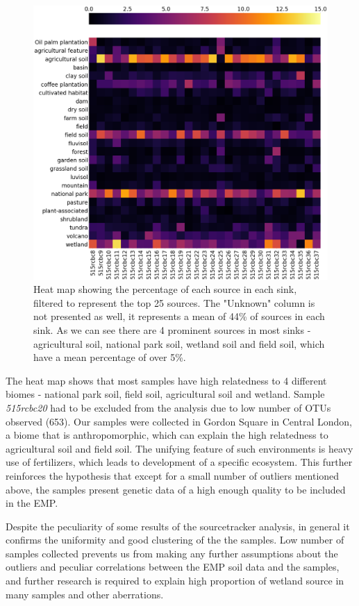 \documentclass[12pt,twocolumn]{article} %
\begin{document}
\begin{figure}[ht!] %
	\includegraphics[width=\linewidth]{heatmap_perc.png}
	\caption{Heat map showing the percentage of each source in each sink, filtered to represent the top 25 sources. The "Unknown" column is not presented as well, it represents a mean of 44\% of sources in each sink. As we can see there are 4 prominent sources in most sinks - agricultural soil, national park soil, wetland soil and field soil, which have a mean percentage of over 5\%.}
	\label{fig:sourcetracker_heatmap}
\end{figure}
\par
The heat map shows that most samples have high relatedness to 4 different biomes - national park soil, field soil, agricultural soil and wetland. Sample \textit{515rcbc20} had to be excluded from the analysis due to low number of OTUs observed (653). Our samples were collected in Gordon Square in Central London, a biome that is anthropomorphic, which can explain the high relatedness to agricultural soil and field soil. The unifying feature of such environments is heavy use of fertilizers, which leads to development of a specific ecosystem\cite{Zhalnina2014}. This further reinforces the hypothesis that except for a small number of outliers mentioned above, the samples present genetic data of a high enough quality to be included in the EMP.
\par
Despite the peculiarity of some results of the sourcetracker analysis, in general it confirms the uniformity and good clustering of the the samples. Low number of samples collected prevents us from making any further assumptions about the outliers and peculiar correlations between the EMP soil data and the samples, and further research is required to explain high proportion of wetland source in many samples and other aberrations.
\par
\end{document}
